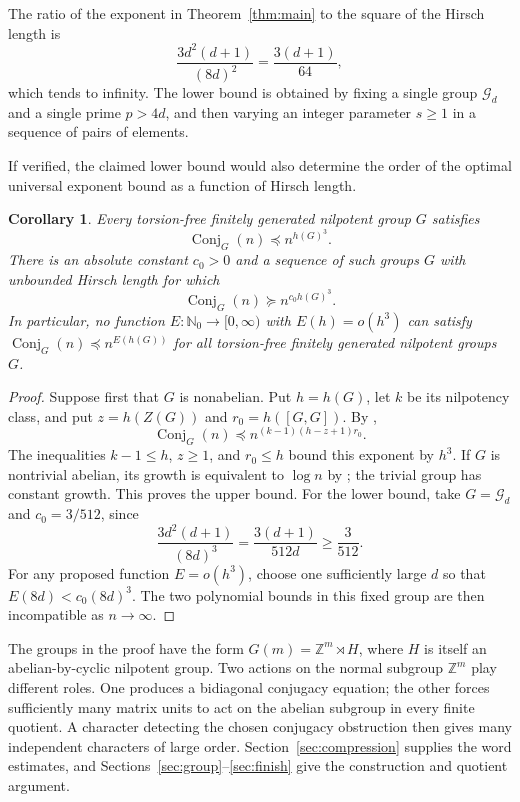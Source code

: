 \documentclass[11pt]{article}
\numberwithin{equation}{section}
\newtheorem{corollary}[theorem]{Corollary}
\theoremstyle{remark}
\newcommand{\Z}{\mathbb Z}
\newcommand{\Conj}{\operatorname{Conj}}
\newcommand{\Gp}{\mathcal G}
\begin{document}
The ratio of the exponent in Theorem~\ref{thm:main} to the square of
the Hirsch length is
\[
 \frac{3d^2(d+1)}{(8d)^2}=\frac{3(d+1)}{64},
\]
which tends to infinity. The lower bound is obtained by fixing a single
group $\Gp_d$ and a single prime $p>4d$, and then varying an integer
parameter $s\ge1$ in a sequence of pairs of elements.

If verified, the claimed lower bound would also determine the order of
the optimal universal exponent bound as a function of Hirsch length.

\begin{corollary}\label{cor:envelope}
Every torsion-free finitely generated nilpotent group $G$ satisfies
\[
 \Conj_G(n)\preceq n^{h(G)^3}.
\]
There is an absolute constant $c_0>0$ and a sequence of such groups
$G$ with unbounded Hirsch length for which
\[
 \Conj_G(n)\succeq n^{c_0 h(G)^3}.
\]
In particular, no function $E:\mathbb N_0\to[0,\infty)$ with
$E(h)=o(h^3)$ can satisfy $\Conj_G(n)\preceq n^{E(h(G))}$ for all
torsion-free finitely generated nilpotent groups $G$.
\end{corollary}

\begin{proof}
Suppose first that $G$ is nonabelian. Put $h=h(G)$, let $k$ be its
nilpotency class, and put $z=h(Z(G))$ and $r_0=h([G,G])$.
By \cite[Theorem~A]{DV},
\[
 \Conj_G(n)\preceq n^{(k-1)(h-z+1)r_0}.
\]
The inequalities $k-1\le h$, $z\ge1$, and $r_0\le h$ bound this exponent
by $h^3$. If $G$ is nontrivial abelian, its growth is equivalent to
$\log n$ by \cite[Proposition~2.1.9]{DV}; the trivial group has constant
growth. This proves the upper bound. For the lower bound, take
$G=\Gp_d$ and $c_0=3/512$, since
\[
 \frac{3d^2(d+1)}{(8d)^3}=\frac{3(d+1)}{512d}\ge\frac{3}{512}.
\]
For any proposed function $E=o(h^3)$, choose one sufficiently large
$d$ so that $E(8d)<c_0(8d)^3$. The two polynomial bounds in this fixed
group are then incompatible as $n\to\infty$.
\end{proof}

The groups in the proof have the form $G(m)=\Z^m\rtimes H$, where
$H$ is itself an abelian-by-cyclic nilpotent group. Two actions on the
normal subgroup $\Z^m$ play different roles. One produces a bidiagonal
conjugacy equation; the other forces sufficiently many matrix units to
act on the abelian subgroup in every finite quotient. A character
detecting the chosen conjugacy obstruction then gives many independent
characters of large order. Section~\ref{sec:compression} supplies the
word estimates, and Sections~\ref{sec:group}--\ref{sec:finish} give the
construction and quotient argument.
\end{document}
